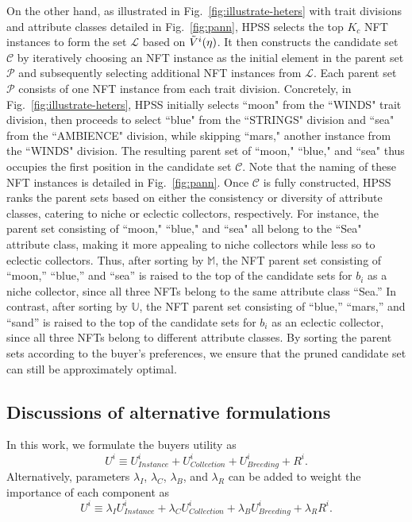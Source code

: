 \documentclass[conference]{IEEEtran}
\theoremstyle{plain}
\newcommand*{\defeq}{\equiv}
\begin{document}
{    On the other hand, as illustrated in Fig.~\ref{fig:illustrate-heters} with trait divisions and attribute classes detailed in Fig.~\ref{fig:pann}, HPSS\xspace selects the top $K_c $ NFT instances to form the set $\mathcal{L}$ based on $\Tilde{V}^i(\eta)$. It then constructs the candidate set $\mathcal{C}$ by iteratively choosing an NFT instance as the initial element in the parent set $\mathcal{P}$ and subsequently selecting additional NFT instances from $\mathcal{L}$. Each parent set $\mathcal{P}$ consists of one NFT instance from each trait division. Concretely, in Fig.~\ref{fig:illustrate-heters}, HPSS\xspace initially selects ``moon" from the ``WINDS" trait division, then proceeds to select ``blue" from the ``STRINGS" division and ``sea" from the ``AMBIENCE" division, while skipping ``mars," another instance from the ``WINDS" division. The resulting parent set of ``moon," ``blue," and ``sea" thus occupies the first position in the candidate set $\mathcal{C}$. Note that the naming of these NFT instances is detailed in Fig.~\ref{fig:pann}. Once $\mathcal{C}$ is fully constructed, HPSS\xspace ranks the parent sets based on either the consistency or diversity of attribute classes, catering to niche or eclectic collectors, respectively. For instance, the parent set consisting of ``moon," ``blue," and ``sea" all belong to the ``Sea" attribute class, making it more appealing to niche collectors while less so to eclectic collectors. Thus, after sorting by $\mathbb{M}$, the NFT parent set consisting of ``moon,'' ``blue,'' and ``sea'' is raised to the top of the candidate sets for $b_i$ as a niche collector, since all three NFTs belong to the same attribute class ``Sea.'' In contrast, after sorting by $\mathbb{U}$, the NFT parent set consisting of ``blue,'' ``mars,'' and ``sand'' is raised to the top of the candidate sets for $b_i$ as an eclectic collector, since all three NFTs belong to different attribute classes. By sorting the parent sets according to the buyer's preferences, we ensure that the pruned candidate set can still be approximately optimal.
    
    


\subsection{Discussions of alternative formulations}
\label{appsub:alternative}
In this work, we formulate the buyers utility as 
\begin{equation}
    U^i \defeq U^i_\textit{Instance} + U^i_\textit{Collection} + U^i_\textit{Breeding} + R^i.
\end{equation}
Alternatively, parameters $\lambda_{I}$, $\lambda_{C}$, $\lambda_{B}$, and $\lambda_{R}$ can be added to weight the importance of each component as
\begin{equation}
    U^i \defeq \lambda_{I}U^i_\textit{Instance} + \lambda_{C}U^i_\textit{Collection} + \lambda_{B}U^i_\textit{Breeding} + \lambda_{R}R^i.
\end{equation}

}
\end{document}
